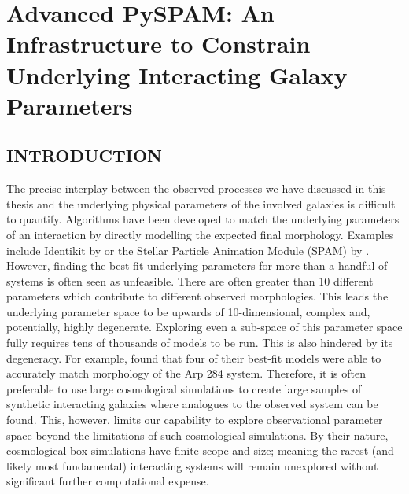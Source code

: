 \chapter{Advanced PySPAM: An Infrastructure to Constrain Underlying Interacting Galaxy Parameters}\label{chapter4}
\section{INTRODUCTION}\label{Introduction}
\noindent The precise interplay between the observed processes we have discussed in this thesis and the underlying physical parameters of the involved galaxies is difficult to quantify. Algorithms have been developed to match the underlying parameters of an interaction by directly modelling the expected final morphology. Examples include Identikit by \citet{2009AJ....137.3071B} or the Stellar Particle Animation Module (SPAM) by \citet{1990AJ....100.1477W}. However, finding the best fit underlying parameters for more than a handful of systems is often seen as unfeasible. There are often greater than 10 different parameters which contribute to different observed morphologies. This leads the underlying parameter space to be upwards of 10-dimensional, complex and, potentially, highly degenerate. Exploring even a sub-space of this parameter space fully requires tens of thousands of models to be run. This is also hindered by its degeneracy. For example, \citet{2010ASPC..423..227S} found that four of their best-fit models were able to accurately match morphology of the Arp 284 system. Therefore, it is often preferable to use large cosmological simulations \citep[e.g.][]{2015MNRAS.446..521S, 2018MNRAS.480..800H, 2020MNRAS.493.3716H} to create large samples of synthetic interacting galaxies where analogues to the observed system can be found. This, however, limits our capability to explore observational parameter space beyond the limitations of such cosmological simulations. By their nature, cosmological box simulations have finite scope and size; meaning the rarest (and likely most fundamental) interacting systems will remain unexplored without significant further computational expense.

